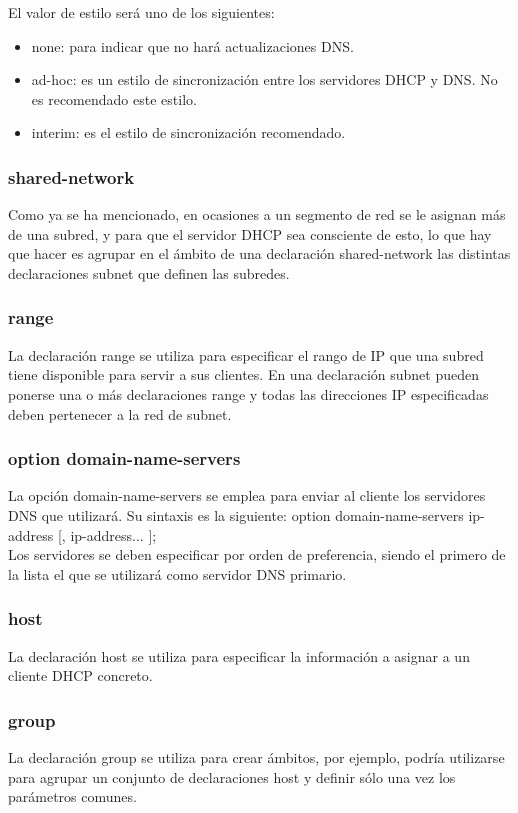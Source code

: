 El valor de estilo será uno de los siguientes:
\begin{itemize}
	\item none: para indicar que no hará actualizaciones DNS.
	\item ad-hoc: es un estilo de sincronización entre los servidores DHCP y DNS. No es recomendado este estilo.
	\item interim: es el estilo de sincronización recomendado.
\end{itemize}

\subsubsection{shared-network}
Como ya se ha mencionado, en ocasiones a un segmento de red se le asignan más de una subred, y para que el servidor DHCP sea consciente de esto, lo que hay que hacer es agrupar en el ámbito de una declaración shared-network las distintas declaraciones subnet que definen las subredes.

\subsubsection{range}
La declaración range se utiliza para especificar el rango de IP que una subred tiene disponible para servir a sus clientes. En una declaración subnet pueden ponerse una o más declaraciones range y todas las direcciones IP especificadas deben pertenecer a la red de subnet.

\subsubsection{option domain-name-servers}
La opción domain-name-servers se emplea para enviar al cliente los servidores DNS que utilizará. Su sintaxis es la siguiente: option domain-name-servers ip-address [, ip-address...  ];\\
Los servidores se deben especificar por orden de preferencia, siendo el primero de la lista el que se utilizará como servidor DNS primario.

\subsubsection{host}
La declaración host se utiliza para especificar la información a asignar a un cliente DHCP concreto.

\subsubsection{group}
La declaración group se utiliza para crear ámbitos, por ejemplo, podría utilizarse para agrupar un conjunto de declaraciones host y definir sólo una vez los parámetros comunes.

